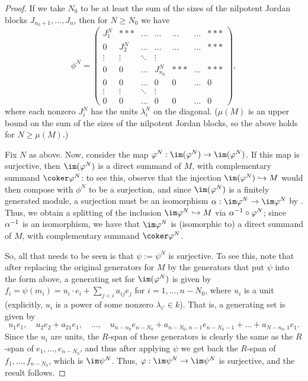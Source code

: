 \documentclass[12pt]{article}
\let\inc\hookrightarrow
\theoremstyle{theorem}
\numberwithin{thm}{section}
\theoremstyle{definition}
\begin{document}
\begin{proof}
  If we take $N_0$ to be at least the sum of the sizes of the nilpotent Jordan blocks $J_{n_0+1},\dots,J_n$, then for $N\geq N_0$ we have
  $$
  \phi^N =
  \begin{pmatrix}
    J_1^N & *** &\dots & \dots& \dots  &\dots & *** \\
    0 & J_2^N & \dots &\dots&\dots & \dots& *** \\
    \vdots &\vdots & \ddots &\vdots \\
    0 & 0 & \dots & J_{n_0}^N & *** & \dots & ***\\
    0 & 0 & \dots & 0 & 0 & \dots & 0\\
    \vdots &\vdots & \ddots &\vdots \\
    0 & 0 & \dots & 0 & 0 & \dots & 0
  \end{pmatrix},
  $$
  where each nonzero $J_i^N$ has the units $\lambda_i^N$ on the diagonal.
  ($\mu(M)$ is an upper bound on the sum of the sizes of the nilpotent Jordan blocks, so the above holds for $N\geq \mu(M)$.)

  Fix $N$ as above.
  Now, consider the map $ \phi^N: \im(\phi^N) \to \im(\phi^N)$. If this map is surjective, then $\im(\phi^N)$ is a direct summand of $M$, with complementary summand $\coker \phi^N$: to see this, observe that the injection $\im(\phi^N) \inc M$ would then  compose with $\phi^N$ to be a surjection, and since $\im(\phi^N)$ is a finitely generated module, a surjection must be an isomorphism $\a:\im \phi^N \to \im \phi^N$ by \cite[Corollary~4.4]{Eisenbud95}. Thus, we obtain a splitting of the inclusion $\im \phi^N \inc M$ via $\alpha^{-1}\circ \varphi^N$; since $\alpha^{-1}$ is an isomorphism, we have that $\im \phi^N$ is (isomorphic to) a direct summand of $M$, with complementary summand $\coker \phi^N$.

  So, all that needs to be seen is that $\psi:=\psi^N$ is surjective.
  To see this, note that after replacing the original generators for $M$ by the generators that put $\psi$ into the form above,  a generating set for $\im(\phi^N)$ is given by $f_i = \psi(m_i) = u_i\cdot e_i + \sum_{j<i } a_{ij} e_j$ for $i = 1,\dots,n-N_0$, where $u_i$ is a unit (explicitly, $u_i$ is a power of some nonzero $\lambda_{i'}\in k$).
  That is, a generating set is given by
  $$u_1 e_1,\quad  u_2 e_2+a_{21}e_1,\quad \dots ,\quad u_{n-n_0}e_{n-N_0}+a_{n-N_0,n-1}e_{n-N_0-1}+\dots + a_{N-n_0,1}e_1.$$
  Since the $u_i$ are units, the $R$-span of these generators is clearly the same as the $R$-span of $e_1,\dots,e_{n-N_0}$, and thus after applying $\psi$ we get back the $R$-span of $f_1,\dots,f_{n-N_0} $, which is $\im \psi^N$. Thus, $\phi: \im \psi^N \to \im \psi^N$ is surjective, and the result follows.
\end{proof}
\end{document}

